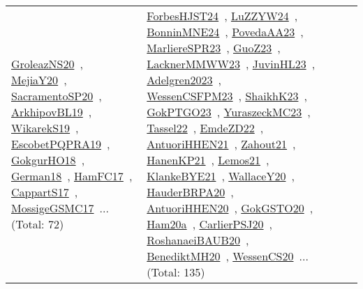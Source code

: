 {\begin{longtable}{lp{3cm}>{\raggedright\arraybackslash}p{6cm}>{\raggedright\arraybackslash}p{6cm}>{\raggedright\arraybackslash}p{8cm}}
\href{../works/GroleazNS20.pdf}{GroleazNS20}~\cite{GroleazNS20}, \href{../works/MejiaY20.pdf}{MejiaY20}~\cite{MejiaY20}, \href{../works/SacramentoSP20.pdf}{SacramentoSP20}~\cite{SacramentoSP20}, \href{../works/ArkhipovBL19.pdf}{ArkhipovBL19}~\cite{ArkhipovBL19}, \href{../works/WikarekS19.pdf}{WikarekS19}~\cite{WikarekS19}, \href{../works/EscobetPQPRA19.pdf}{EscobetPQPRA19}~\cite{EscobetPQPRA19}, \href{../works/GokgurHO18.pdf}{GokgurHO18}~\cite{GokgurHO18}, \href{../works/German18.pdf}{German18}~\cite{German18}, \href{../works/HamFC17.pdf}{HamFC17}~\cite{HamFC17}, \href{../works/CappartS17.pdf}{CappartS17}~\cite{CappartS17}, \href{../works/MossigeGSMC17.pdf}{MossigeGSMC17}~\cite{MossigeGSMC17}... (Total: 72) & \href{../works/ForbesHJST24.pdf}{ForbesHJST24}~\cite{ForbesHJST24}, \href{../works/LuZZYW24.pdf}{LuZZYW24}~\cite{LuZZYW24}, \href{../works/BonninMNE24.pdf}{BonninMNE24}~\cite{BonninMNE24}, \href{../works/PovedaAA23.pdf}{PovedaAA23}~\cite{PovedaAA23}, \href{../works/MarliereSPR23.pdf}{MarliereSPR23}~\cite{MarliereSPR23}, \href{../works/GuoZ23.pdf}{GuoZ23}~\cite{GuoZ23}, \href{../works/LacknerMMWW23.pdf}{LacknerMMWW23}~\cite{LacknerMMWW23}, \href{../works/JuvinHL23.pdf}{JuvinHL23}~\cite{JuvinHL23}, \href{../works/Adelgren2023.pdf}{Adelgren2023}~\cite{Adelgren2023}, \href{../works/WessenCSFPM23.pdf}{WessenCSFPM23}~\cite{WessenCSFPM23}, \href{../works/ShaikhK23.pdf}{ShaikhK23}~\cite{ShaikhK23}, \href{../works/GokPTGO23.pdf}{GokPTGO23}~\cite{GokPTGO23}, \href{../works/YuraszeckMC23.pdf}{YuraszeckMC23}~\cite{YuraszeckMC23}, \href{../works/Tassel22.pdf}{Tassel22}~\cite{Tassel22}, \href{../works/EmdeZD22.pdf}{EmdeZD22}~\cite{EmdeZD22}, \href{../works/AntuoriHHEN21.pdf}{AntuoriHHEN21}~\cite{AntuoriHHEN21}, \href{../works/Zahout21.pdf}{Zahout21}~\cite{Zahout21}, \href{../works/HanenKP21.pdf}{HanenKP21}~\cite{HanenKP21}, \href{../works/Lemos21.pdf}{Lemos21}~\cite{Lemos21}, \href{../works/KlankeBYE21.pdf}{KlankeBYE21}~\cite{KlankeBYE21}, \href{../works/WallaceY20.pdf}{WallaceY20}~\cite{WallaceY20}, \href{../works/HauderBRPA20.pdf}{HauderBRPA20}~\cite{HauderBRPA20}, \href{../works/AntuoriHHEN20.pdf}{AntuoriHHEN20}~\cite{AntuoriHHEN20}, \href{../works/GokGSTO20.pdf}{GokGSTO20}~\cite{GokGSTO20}, \href{../works/Ham20a.pdf}{Ham20a}~\cite{Ham20a}, \href{../works/CarlierPSJ20.pdf}{CarlierPSJ20}~\cite{CarlierPSJ20}, \href{../works/RoshanaeiBAUB20.pdf}{RoshanaeiBAUB20}~\cite{RoshanaeiBAUB20}, \href{../works/BenediktMH20.pdf}{BenediktMH20}~\cite{BenediktMH20}, \href{../works/WessenCS20.pdf}{WessenCS20}~\cite{WessenCS20}... (Total: 135)\\

\end{longtable}}
